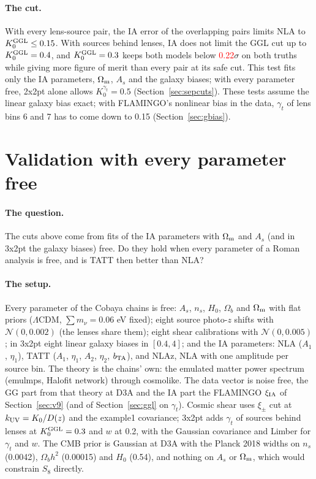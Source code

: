 \documentclass[11pt]{article}
\newcommand{\kuv}{k_{\rm UV}}
\newcommand{\Om}{\Omega_{\rm m}}
\newif\ifnumbersfinal
\newcommand{\refresh}[1]{\ifnumbersfinal#1\else\textcolor{red}{#1}\fi}
\newcommand{\GGLbehMaxThree}{\refresh{0.22}}
\begin{document}
\paragraph{The cut.}
With every lens-source pair, the IA error of the overlapping pairs limits
NLA to $K_0^{\rm GGL} \le 0.15$. With sources behind lenses, IA does not
limit the GGL cut up to $K_0^{\rm GGL} = 0.4$, and $K_0^{\rm GGL} = 0.3$
keeps both models below \GGLbehMaxThree$\sigma$ on both truths while giving
more figure of merit than every pair at its safe cut. This test fits only
the IA parameters, $\Om$, $A_s$ and the galaxy biases; with every parameter
free, 2x2pt alone allows $K_0^{\gamma_t} = 0.5$
(Section~\ref{sec:sepcuts}). These tests assume the linear galaxy bias
exact; with FLAMINGO's nonlinear bias in the data, $\gamma_t$ of lens bins 6
and 7 has to come down to 0.15 (Section~\ref{sec:gbias}).

\section{Validation with every parameter free}
\label{sec:cutval}

\paragraph{The question.}
The cuts above come from fits of the IA parameters with $\Om$ and $A_s$
(and in 3x2pt the galaxy biases) free. Do they hold when every parameter
of a Roman analysis is free, and is TATT then better than NLA?

\paragraph{The setup.}
Every parameter of the Cobaya chains is free: $A_s$, $n_s$, $H_0$,
$\Omega_b$ and $\Om$ with flat priors ($\Lambda$CDM, $\sum m_\nu = 0.06$
eV fixed); eight source photo-$z$ shifts with $\mathcal N(0, 0.002)$ (the
lenses share them); eight shear calibrations with $\mathcal N(0, 0.005)$;
in 3x2pt eight linear galaxy biases in $[0.4, 4]$; and the IA parameters:
NLA ($A_1$, $\eta_1$), TATT ($A_1$, $\eta_1$, $A_2$, $\eta_2$, $b_{\rm
TA}$), and NLAz, NLA with one amplitude per source bin. The theory is the
chains' own: the emulated matter power spectrum (emulmps, Halofit network)
through cosmolike. The data vector is noise free, the GG part from that
theory at D3A and the IA part the FLAMINGO $\xi_{\rm IA}$ of
Section~\ref{sec:v9} (and of Section~\ref{sec:ggl} on $\gamma_t$). Cosmic
shear uses $\xi_\pm$ cut at $\kuv = K_0/D(z)$ and the example1
covariance; 3x2pt adds $\gamma_t$ of sources behind lenses at $K_0^{\rm
GGL} = 0.3$ and $w$ at 0.2, with the Gaussian covariance and Limber for
$\gamma_t$ and $w$. The CMB prior is Gaussian at D3A with the Planck 2018
widths on $n_s$ (0.0042), $\Omega_b h^2$ (0.00015) and $H_0$ (0.54), and
nothing on $A_s$ or $\Om$, which would constrain $S_8$ directly.
\end{document}
